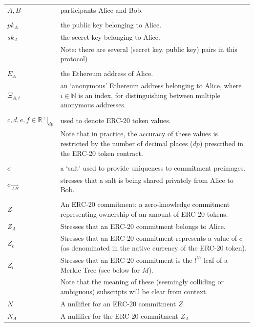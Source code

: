 \documentclass{article}
\begin{document}
\begin{center}
	\begin{tabular}{lp{14cm}}
    $A, B$        & participants Alice and Bob.\\
    \\
    $pk_A$        & the public key belonging to Alice.\\
    $sk_A$        & the secret key belonging to Alice.\\
                  & Note: there are several (secret key, public key) pairs in this protocol)\\
    \\
    $E_A$         & the Ethereum address of Alice.\\
    $\Xi_{A,i}$   & an `anonymous' Ethereum address belonging to Alice, where $i\in\mathbb{N}$ is an index, for distinguishing between multiple anonymous addresses.\\
    \\
    $c, d, e, f \in \mathbb{R}^+\rvert_{dp}$ & used to denote ERC-20 token values.\\
                  & Note that in practice, the accuracy of these values is restricted by the number of decimal places ($dp$) prescribed in the ERC-20 token contract.\\
    \\
    $\sigma$      & a `salt' used to provide uniqueness to commitment preimages.\\
    $\sigma_{\vec{AB}}$ & stresses that a salt is being shared privately from Alice to Bob.\\
    \\
    $Z$           & An ERC-20 commitment; a zero-knowledge commitment representing ownership of an amount of ERC-20 tokens. \\
    $Z_A$         & Stresses that an ERC-20 commitment belongs to Alice.\\
    $Z_c$         & Stresses that an ERC-20 commitment represents a value of $c$ (as denominated in the native currency of the ERC-20 token).\\
    $Z_{l}$       & Stresses that an ERC-20 commitment is the $l^{th}$ leaf of a Merkle Tree (see below for $M$).\\
                  & Note that the meaning of these (seemingly colliding or ambiguous) subscripts will be clear from context.\\
    $N$           & A nullifier for an ERC-20 commitment $Z$.\\
    $N_A$         & A nullifier for the ERC-20 commitment $Z_A$\\

\end{tabular}
\end{center}
\end{document}
